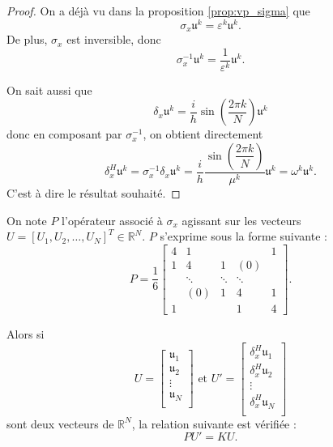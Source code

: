 \begin{proof}
On a déjà vu dans la proposition \ref{prop:vp_sigma} que 
\begin{equation}
\sigma_x \mathfrak{u}^k = \varepsilon^k \mathfrak{u}^k.
\end{equation}
De plus, $\sigma_x$ est inversible, donc 
\begin{equation}
\sigma_x^{-1} \mathfrak{u}^k = \dfrac{1}{\varepsilon^k} \mathfrak{u}^k.
\end{equation}

On sait aussi que 
\begin{equation}
\delta_x \mathfrak{u}^k = \dfrac{i}{h} \sin \left( \dfrac{2 \pi k}{N} \right) \mathfrak{u}^k
\end{equation}
donc en composant par $\sigma_x^{-1}$, on obtient directement 
\begin{equation}
\delta^H_x \mathfrak{u}^k = \sigma_x^{-1} \delta_x \mathfrak{u}^k = \dfrac{i}{h} \dfrac{\sin \left( \dfrac{2 \pi k}{N} \right)}{\mu^k} \mathfrak{u}^k = \omega^k \mathfrak{u}^k.
\end{equation}
C'est à dire le résultat souhaité.
\end{proof}

On note $P$ l'opérateur associé à $\sigma_x$ agissant sur les vecteurs $U = [U_1, U_2, \ldots, U_N]^T \in \mathbb{R}^N$. $P$ s'exprime sous la forme suivante :
\begin{equation}
P = \dfrac{1}{6} 
\begin{bmatrix}
4 & 1 &   &   & 1 \\ 
1 & 4 & 1 & (0) &   \\ 
  & \ddots & \ddots & \ddots &   \\ 
  & (0) & 1 & 4 & 1 \\ 
1 &   &  & 1 & 4
\end{bmatrix}.
\end{equation}

Alors si
\begin{equation}
U = \begin{bmatrix}
\mathfrak{u}_1 \\
\mathfrak{u}_2 \\
\vdots \\
\mathfrak{u}_N \\
\end{bmatrix} \text{ et } 
U' = \begin{bmatrix}
\delta_x^H \mathfrak{u}_1 \\
\delta_x^H \mathfrak{u}_2 \\
\vdots \\
\delta_x^H \mathfrak{u}_N \\
\end{bmatrix}
\end{equation}
sont deux vecteurs de $\mathbb{R}^N$, la relation suivante est vérifiée :
\begin{equation}
P U' = K U.
\end{equation}

